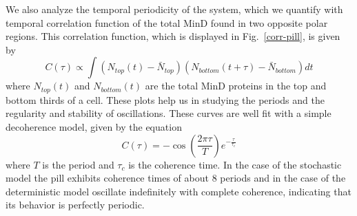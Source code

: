 \documentclass[10pt,letterpaper]{article}
\begin{document}
We also analyze the temporal periodicity of the system, which we
quantify with temporal correlation function of the total MinD found in
two opposite polar regions.  This correlation function, which is
displayed in Fig.~\ref{corr-pill}, is given by
\begin{equation}
  C(\tau) \propto \int
  (N_{\textit{top}}(t) - \bar N_{\textit{top}})
  (N_{\textit{bottom}}(t+\tau) - \bar N_{\textit{bottom}})dt
\end{equation}
where $N_{\textit{top}}(t)$ and $N_{\textit{bottom}}(t)$ are the total
MinD proteins in the top and bottom thirds of a cell.  These plots
help us in studying the periods and the regularity and stability of
oscillations.  These curves are well fit with a simple decoherence
model, given by the equation
\begin{equation}
  C(\tau) = -\cos\left(\frac{2\pi\tau}{T}\right) e^{-\frac{\tau}{\tau_c}}
\end{equation}
where $T$ is the period and $\tau_c$ is the coherence time.  In the
case of the stochastic model the pill exhibits coherence times of
about 8 periods and in the case of the deterministic model oscillate
indefinitely with complete coherence, indicating that its behavior is
perfectly periodic.
\end{document}
